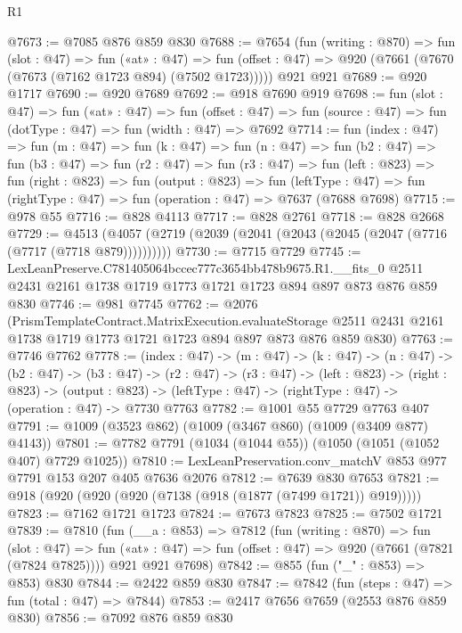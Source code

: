 \begin{lexlean}{R1}
\begin{coremodule}
@7673 := @7085 @876 @859 @830
@7688 := @7654
    (fun (writing : @870) =>
    fun (slot : @47) =>
    fun («at» : @47) =>
    fun (offset : @47) => @920 (@7661 (@7670 (@7673 (@7162 @1723 @894) (@7502 @1723)))))
    @921
    @921
@7689 := @920 @1717
@7690 := @920 @7689
@7692 := @918 @7690 @919
@7698 := fun (slot : @47) =>
  fun («at» : @47) =>
  fun (offset : @47) => fun (source : @47) => fun (dotType : @47) => fun (width : @47) => @7692
@7714 := fun (index : @47) =>
  fun (m : @47) =>
  fun (k : @47) =>
  fun (n : @47) =>
  fun (b2 : @47) =>
  fun (b3 : @47) =>
  fun (r2 : @47) =>
  fun (r3 : @47) =>
  fun (left : @823) =>
  fun (right : @823) =>
  fun (output : @823) =>
  fun (leftType : @47) => fun (rightType : @47) => fun (operation : @47) => @7637 (@7688 @7698)
@7715 := @978 @55
@7716 := @828 @4113
@7717 := @828 @2761
@7718 := @828 @2668
@7729 := @4513 (@4057 (@2719 (@2039 (@2041 (@2043 (@2045 (@2047 (@7716 (@7717 (@7718 @879))))))))))
@7730 := @7715 @7729
@7745 := LexLeanPreserve.C781405064bccec777c3654bb478b9675.R1.__fits_0
    @2511
    @2431
    @2161
    @1738
    @1719
    @1773
    @1721
    @1723
    @894
    @897
    @873
    @876
    @859
    @830
@7746 := @981 @7745
@7762 := @2076
    (PrismTemplateContract.MatrixExecution.evaluateStorage
      @2511
      @2431
      @2161
      @1738
      @1719
      @1773
      @1721
      @1723
      @894
      @897
      @873
      @876
      @859
      @830)
@7763 := @7746 @7762
@7778 := (index : @47) ->
  (m : @47) ->
  (k : @47) ->
  (n : @47) ->
  (b2 : @47) ->
  (b3 : @47) ->
  (r2 : @47) ->
  (r3 : @47) ->
  (left : @823) ->
  (right : @823) ->
  (output : @823) -> (leftType : @47) -> (rightType : @47) -> (operation : @47) -> @7730 @7763
@7782 := @1001 @55 @7729 @7763 @407
@7791 := @1009 (@3523 @862) (@1009 (@3467 @860) (@1009 (@3409 @877) @4143))
@7801 := @7782 @7791 (@1034 (@1044 @55)) (@1050 (@1051 (@1052 @407) @7729 @1025))
@7810 := LexLeanPreservation.conv_matchV @853 @977 @7791 @153 @207 @405 @7636 @2076
@7812 := @7639 @830 @7653
@7821 := @918 (@920 (@920 (@920 (@7138 (@918 (@1877 (@7499 @1721)) @919)))))
@7823 := @7162 @1721 @1723
@7824 := @7673 @7823
@7825 := @7502 @1721
@7839 := @7810
    (fun (__a : @853) =>
    @7812
      (fun (writing : @870) =>
      fun (slot : @47) =>
      fun («at» : @47) => fun (offset : @47) => @920 (@7661 (@7821 (@7824 @7825))))
      @921
      @921
      @7698)
@7842 := @855 (fun ("_" : @853) => @853) @830
@7844 := @2422 @859 @830
@7847 := @7842 (fun (steps : @47) => fun (total : @47) => @7844)
@7853 := @2417 @7656 @7659 (@2553 @876 @859 @830)
@7856 := @7092 @876 @859 @830

\end{coremodule}
\end{lexlean}
